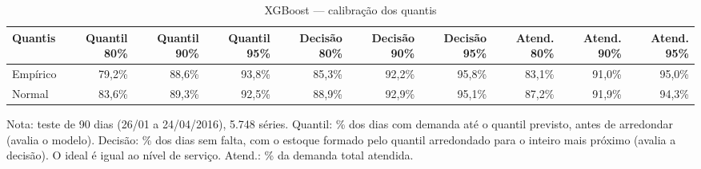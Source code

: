 \begin{table}[htbp]
\centering
\small
\caption{XGBoost — calibração dos quantis}
\label{tab:xgb_calibracao}
\begin{tabular}{lrrrrrrrrr}
\toprule
Quantis & Quantil 80\% & Quantil 90\% & Quantil 95\% & Decisão 80\% & Decisão 90\% & Decisão 95\% & Atend. 80\% & Atend. 90\% & Atend. 95\% \\
\midrule
Empírico & 79,2\% & 88,6\% & 93,8\% & 85,3\% & 92,2\% & 95,8\% & 83,1\% & 91,0\% & 95,0\% \\
Normal & 83,6\% & 89,3\% & 92,5\% & 88,9\% & 92,9\% & 95,1\% & 87,2\% & 91,9\% & 94,3\% \\
\bottomrule
\end{tabular}
\par\smallskip
{\footnotesize Nota: teste de 90 dias (26/01 a 24/04/2016), 5.748 séries. Quantil: \% dos dias com demanda até o quantil previsto, antes de arredondar (avalia o modelo). Decisão: \% dos dias sem falta, com o estoque formado pelo quantil arredondado para o inteiro mais próximo (avalia a decisão). O ideal é igual ao nível de serviço. Atend.: \% da demanda total atendida.}
\end{table}
